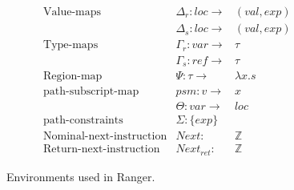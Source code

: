\begin{figure}
$$
\begin{array}{lllll}
\text{Value-maps} & \Delta_r: loc \rightarrow & ( val, exp) &&
\\
& \Delta_s: loc \rightarrow & ( val, exp) &&
\\
\text{Type-maps}  & \Gamma_r: var \rightarrow & \tau & &
\\
& \Gamma_s: ref \rightarrow & \tau&&
\\
\text{Region-map} & \Psi: \tau \rightarrow & \lambda x.s &&
\\
\text{path-subscript-map} & psm: v \rightarrow & x &&
\\
& \Theta: var \rightarrow & loc &&
\\
\text{path-constraints} & \Sigma: \{exp\} &  &  & 
\\
\text{Nominal-next-instruction} & Next: & \mathbb{Z} &  & 
\\
\text{Return-next-instruction} & Next_{ret}: & \mathbb{Z} &  & 
\end{array}
$$
\caption{Environments used in Ranger.}
\label{fig:environment}
\end{figure}


